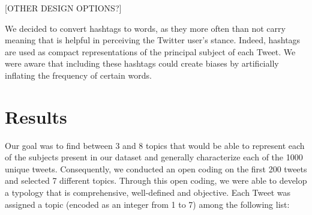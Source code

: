 \documentclass[letterpaper]{article} %
\begin{document}

[OTHER DESIGN OPTIONS?]

We decided to convert hashtags to words, as they more often than not carry meaning that is helpful in perceiving the Twitter user's stance. Indeed, hashtags are used as compact representations of the principal subject of each Tweet. We were aware that including these hashtags could create biases by artificially inflating the frequency of certain words. 

\section{Results}




Our goal was to find between 3 and 8 topics that would be able to represent each of the subjects present in our dataset and generally characterize each of the 1000 unique tweets. Consequently, we conducted an open coding on the first 200 tweets and selected 7 different topics. Through this open coding, we were able to develop a typology that is comprehensive, well-defined and objective. Each Tweet was assigned a topic (encoded as an integer from 1 to 7) among the following list: 
\end{document}
